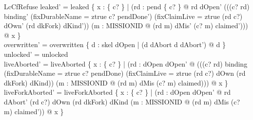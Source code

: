 \documentclass[a4paper,10pt,fleqn]{article}
\begin{document}
\begin{schema}{LcCfRefuse}
leaked' = leaked \cup \{ x : \{ c? \} | (\exists rd : pend \limg \{ c? \} \rimg @ rd \in dOpen' \land \lnot (((c? \mapsto rd) \in binding' \lor (fixDurableName = ztrue \land c? \in pendDone') \lor (fixClaimLive = ztrue \land (rd \mapsto c?) \in dOwn' \land (rd \mapsto dkFork) \in dKind')) \land (\exists m : MISSIONID @ (rd \mapsto m) \in dMis' \land (c? \mapsto m) \in claimed'))) @ x \} \\
overwritten' = overwritten \cup \{ d : skel \setminus dOpen | (d \in dAbort \iff d \notin dAbort') @ d \} \\
unlocked' = unlocked \\
liveAborted' = liveAborted \cup \{ x : \{ c? \} | (\exists rd : dOpen \setminus dOpen' @ (((c? \mapsto rd) \in binding \lor (fixDurableName = ztrue \land c? \in pendDone) \lor (fixClaimLive = ztrue \land (rd \mapsto c?) \in dOwn \land (rd \mapsto dkFork) \in dKind)) \land (\exists m : MISSIONID @ (rd \mapsto m) \in dMis \land (c? \mapsto m) \in claimed))) @ x \} \\
liveForkAborted' = liveForkAborted \cup \{ x : \{ c? \} | (\exists rd : dOpen \setminus dOpen' @ rd \in dAbort' \land (rd \mapsto c?) \in dOwn \land (rd \mapsto dkFork) \in dKind \land (\exists m : MISSIONID @ (rd \mapsto m) \in dMis \land (c? \mapsto m) \in claimed')) @ x \}
\end{schema}
\end{document}
